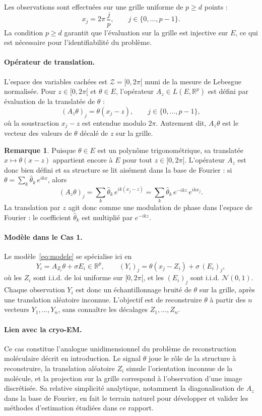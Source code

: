 \documentclass[12pt, a4paper]{article}
\theoremstyle{definition}
\newtheorem{remark}[theorem]{Remarque}
\newcommand{\R}{\mathbb{R}}
\newcommand{\Zcal}{\mathcal{Z}}
\newcommand{\Ncal}{\mathcal{N}}
\begin{document}
Les observations sont effectuées sur une grille uniforme de $p \geq d$ points :
\[
    x_j = 2\pi\,\frac{j}{p}, \qquad j \in \{0, \ldots, p-1\}.
\]
La condition $p \geq d$ garantit que l'évaluation sur la grille est injective
sur $E$, ce qui est nécessaire pour l'identifiabilité du problème.

\paragraph{Opérateur de translation.}
L'espace des variables cachées est $\Zcal = [0, 2\pi[$ muni de la mesure de
Lebesgue normalisée. Pour $z \in [0, 2\pi[$ et $\theta \in E$, l'opérateur
$A_z \in L(E, \R^p)$ est défini par évaluation de la translatée de $\theta$ :
\[
    (A_z\theta)_j = \theta(x_j - z), \qquad j \in \{0, \ldots, p-1\},
\]
où la soustraction $x_j - z$ est entendue modulo $2\pi$. Autrement dit, $A_z\theta$
est le vecteur des valeurs de $\theta$ décalé de $z$ sur la grille.

\begin{remark}
    Puisque $\theta \in E$ est un polynôme trigonométrique, sa translatée
    $x \mapsto \theta(x - z)$ appartient encore à $E$ pour tout $z \in [0, 2\pi[$.
    L'opérateur $A_z$ est donc bien défini et sa structure se lit aisément dans la
    base de Fourier : si $\theta = \sum_k \hat{\theta}_k\, e^{ikx}$, alors
    \[
        (A_z\theta)_j = \sum_{k} \hat{\theta}_k\, e^{ik(x_j - z)}
        = \sum_{k} \hat{\theta}_k\, e^{-ikz}\, e^{ikx_j}.
    \]
    La translation par $z$ agit donc comme une modulation de phase dans l'espace de
    Fourier : le coefficient $\hat{\theta}_k$ est multiplié par $e^{-ikz}$.
\end{remark}

\paragraph{Modèle dans le Cas 1.}
Le modèle~\eqref{eq:modele} se spécialise ici en
\[
    Y_i = A_{Z_i}\theta + \sigma E_i \in \R^p,
    \qquad (Y_i)_j = \theta(x_j - Z_i) + \sigma\,(E_i)_j,
\]
où les $Z_i$ sont i.i.d. de loi uniforme sur $[0, 2\pi[$, et les $(E_i)_j$
sont i.i.d. $\Ncal(0, 1)$. Chaque observation $Y_i$ est donc un échantillonnage
bruité de $\theta$ sur la grille, après une translation aléatoire inconnue.
L'objectif est de reconstruire $\theta$ à partir des $n$ vecteurs $Y_1, \ldots, Y_n$,
sans connaître les décalages $Z_1, \ldots, Z_n$.

\paragraph{Lien avec la cryo-EM.}
Ce cas constitue l'analogue unidimensionnel du problème de reconstruction
moléculaire décrit en introduction. Le signal $\theta$ joue le rôle de la structure
à reconstruire, la translation aléatoire $Z_i$ simule l'orientation inconnue de la
molécule, et la projection sur la grille correspond à l'observation d'une image
discrétisée. Sa relative simplicité analytique, notamment la diagonalisation
de $A_z$ dans la base de Fourier, en fait le terrain naturel pour développer
et valider les méthodes d'estimation étudiées dans ce rapport.
\end{document}
